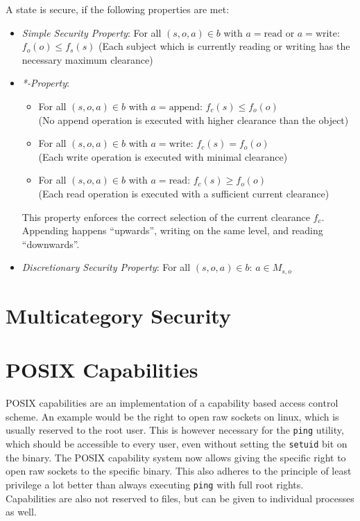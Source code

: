 A state is secure, if the following properties are met:
\begin{itemize}
    \item \emph{Simple Security Property}: For all $(s, o, a) \in b$ with
          $a=\text{read}$ or $a=\text{write}$: $f_o(o) \leq f_s(s)$ (Each
          subject which is currently reading or writing has the necessary
          maximum clearance)
    \item \emph{*-Property}:
          \begin{itemize}
              \item For all $(s,o,a)\in b$ with $a=\text{append}$: $f_c(s) \leq
                        f_o(o)$ \\ (No append operation is executed with higher
                        clearance than the object)
              \item For all $(s,o,a)\in b$ with $a=\text{write}$: $f_c(s) =
                        f_o(o)$ \\ (Each write operation is executed with
                        minimal clearance)
              \item For all $(s,o,a)\in b$ with $a=\text{read}$: $f_c(s) \geq
                        f_o(o)$ \\ (Each read operation is executed with a
                        sufficient current clearance)
          \end{itemize}
          This property enforces the correct selection of the current clearance
          $f_c$. Appending happens ``upwards'', writing on the same level, and
          reading ``downwards''.
    \item \emph{Discretionary Security Property}: For all $(s,o,a) \in b$: $a
              \in M_{s,o}$
\end{itemize}

\section{Multicategory Security}

\section{POSIX Capabilities}
POSIX capabilities are an implementation of a capability based access control
scheme. An example would be the right to open raw sockets on linux, which is
usually reserved to the root user. This is however necessary for the
\texttt{ping} utility, which should be accessible to every user, even without
setting the \texttt{setuid} bit on the binary. The POSIX capability system now
allows giving the specific right to open raw sockets to the specific binary.
This also adheres to the principle of least privilege a lot better than always
executing \texttt{ping} with full root rights. Capabilities are also not
reserved to files, but can be given to individual processes as well.

